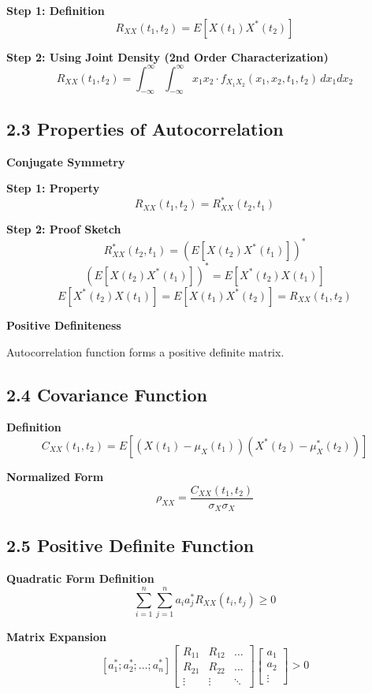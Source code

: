 \documentclass[12pt]{article}
\begin{document}
\textbf{Step 1: Definition}
\[
R_{XX}(t_1, t_2) = E[X(t_1) X^*(t_2)]
\]

\textbf{Step 2: Using Joint Density (2nd Order Characterization)}
\[
R_{XX}(t_1,t_2) = \int_{-\infty}^{\infty} \int_{-\infty}^{\infty}
x_1 x_2 \cdot f_{X_1 X_2}(x_1,x_2,t_1,t_2)\,dx_1 dx_2
\]

\subsection*{2.3 Properties of Autocorrelation}

\textbf{Conjugate Symmetry}

\textbf{Step 1: Property}
\[
R_{XX}(t_1,t_2) = R_{XX}^*(t_2,t_1)
\]

\textbf{Step 2: Proof Sketch}
\[
R_{XX}^*(t_2,t_1) = (E[X(t_2)X^*(t_1)])^*
\]
\[
(E[X(t_2)X^*(t_1)])^* = E[X^*(t_2)X(t_1)]
\]
\[
E[X^*(t_2)X(t_1)] = E[X(t_1)X^*(t_2)] = R_{XX}(t_1,t_2)
\]

\textbf{Positive Definiteness}

Autocorrelation function forms a positive definite matrix.

\subsection*{2.4 Covariance Function}

\textbf{Definition}
\[
C_{XX}(t_1,t_2) = E[(X(t_1) - \mu_X(t_1))(X^*(t_2) - \mu_X^*(t_2))]
\]

\textbf{Normalized Form}
\[
\rho_{XX} = \frac{C_{XX}(t_1,t_2)}{\sigma_X \sigma_X}
\]

\subsection*{2.5 Positive Definite Function}

\textbf{Quadratic Form Definition}
\[
\sum_{i=1}^{n} \sum_{j=1}^{n} a_i a_j^* R_{XX}(t_i,t_j) \ge 0
\]

\textbf{Matrix Expansion}
\[
[a_1^* ; a_2^* ; \dots ; a_n^*]
\begin{bmatrix}
R_{11} & R_{12} & \dots \\
R_{21} & R_{22} & \dots \\
\vdots & \vdots & \ddots
\end{bmatrix}
\begin{bmatrix}
a_1 \\ a_2 \\ \vdots
\end{bmatrix}
> 0
\]
\end{document}
